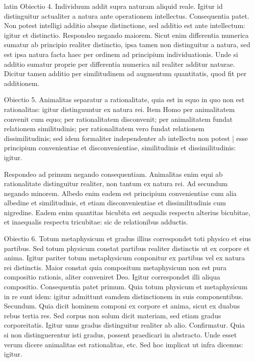 \begin{otherlanguage*}{latin}
\pstart
 Obiectio 4. Individuum addit supra naturam aliquid reale. Igitur id distinguitur actualiter a natura ante operationem intellectus. Consequentia patet. Non potest intelligi additio absque distinctione, sed additio est ante intellectum: igitur et distinctio. Respondeo negando maiorem. Sicut enim differentia numerica sumatur ab principio realiter distinctio, ipsa tamen non distinguitur a natura, sed est ipsa natura facta haec per ordinem ad principium individuationis. Unde si additio sumatur proprie per differentia numerica nil realiter additur naturae. Dicitur tamen additio per similitudinem ad augmentum quantitatis, quod fit per additionem. 
\pend

\pstart
 Obiectio 5. Animalitas separatur a rationalitate, quia est in equo in quo non est rationalitas: igitur distinguuntur ex natura rei. Item Homo per animalitatem convenit cum equo; per rationalitatem disconvenit; per animalitatem fundat relationem similitudinis; per rationalitatem vero fundat relationem dissimilitudinis; sed idem formaliter independenter ab intellectu non potest \textnormal{|}  esse principium convenientiae et disconvenientiae, similitudinis et dissimilitudinis: igitur. 
\pend

\pstart
 Respondeo ad primum negando consequentiam. Animalitas enim equi ab  rationalitate distinguitur realiter, non tantum ex natura rei. Ad secundum negando minorem. Albedo enim eadem est principium convenientiae cum alia albedine et similitudinis, et etiam disconvenientiae et dissimilitudinis cum nigredine. Eadem enim quantitas bicubita est aequalis respectu alterius bicubitae, et inaequalis respectu tricubitae: sic de relationibus adductis. 
\pend

\pstart
 Obiectio 6. Totum metaphysicum et gradus illius correspondet toti physico et eius partibus. Sed totum physicum constat partibus realiter distinctis ut ex corpore et anima. Igitur pariter totum metaphysicum conponitur ex partibus vel ex natura rei distinctis. Maior constat quia compositum metaphysicum non est pura compositio rationis, aliter conveniret Deo. Igitur correspondet illi aliqua compositio. Consequentia patet primum. Quia totum physicum et metaphysicum in re sunt idem: igitur admittunt eamdem distinctionem in suis componentibus. Secundum. Quia  dicit hominem componi ex corpore et anima, sicut ex duabus rebus tertia res. Sed corpus non solum dicit materiam, sed etiam gradus corporeitatis. Igitur unus gradus distinguitur realiter ab alio. Confirmatur. Quia si non distinguerentur isti gradus, possent praedicari in abstracto. Unde esset verum dicere animalitas est rationalitas, etc. Sed hoc implicat ut infra dicemus: igitur. 
\pend


\end{otherlanguage*}
